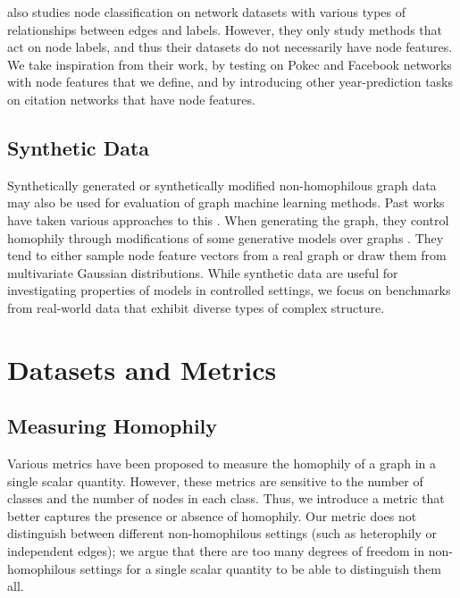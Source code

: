 \documentclass[sigconf, balance=false]{acmart}
\begin{document}
\citet{peel2017graph} also studies node classification on network datasets with various types of relationships between edges and labels. However, they only study methods that act on node labels, and thus their datasets do not necessarily have node features. We take inspiration from their work, by testing on Pokec and Facebook networks with node features that we define, and by introducing other year-prediction tasks on citation networks that have node features.

\subsection{Synthetic Data}

Synthetically generated or synthetically modified non-homophilous graph data may also be used for evaluation of graph machine learning methods. Past works have taken various approaches to this \cite{karimi2018homophily, abu2019mixhop, zhu2020beyond, kim2021how, chien2021adaptive}.  When generating the graph, they control homophily through modifications of some generative models over graphs \cite{barabasi1999emergence, abbe2017community, deshpande2018contextual}. They tend to either sample node feature vectors from a real graph or draw them from multivariate Gaussian distributions. While synthetic data are useful for investigating properties of models in controlled settings, we focus on benchmarks from real-world data that exhibit diverse types of complex structure.


\section{Datasets and Metrics}

\subsection{Measuring Homophily}\label{sec:measure}

Various metrics have been proposed to measure the homophily of a graph in a single scalar quantity. However, these metrics are sensitive to the number of classes and the number of nodes in each class.
Thus, we introduce a metric that better captures the presence or absence of homophily. Our metric does not distinguish between different non-homophilous settings (such as heterophily or independent edges); we argue that there are too many degrees of freedom in non-homophilous settings for a single scalar quantity to be able to distinguish them all.
\end{document}
